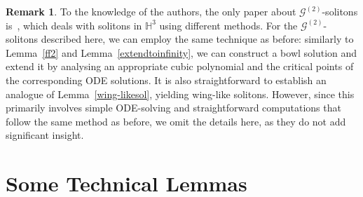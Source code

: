 \documentclass[oneside,12pt]{amsart}
\theoremstyle{definition}
\newtheorem{remark}[lemma]{Remark}
\begin{document}
\begin{remark}
To the knowledge of the authors, the only paper about $\mathcal{G}^{(2)}$-solitons is~\cite{LRS}, which deals with solitons in $\mathbb{H}^3$ using different methods. For the $\mathcal{G}^{(2)}$-solitons described here, we can employ the same technique as before: similarly to Lemma~\ref{ff2} and Lemma~\ref{extendtoinfinity}, we can construct a bowl solution and extend it by analysing an appropriate cubic polynomial and the critical points of the corresponding ODE solutions. It is also straightforward to establish an analogue of Lemma~\ref{wing-likesol}, yielding wing-like solitons. However, since this primarily involves simple ODE-solving and straightforward computations that follow the same method as before, we omit the details here, as they do not add significant insight. 
\end{remark}

\FloatBarrier

\appendix

\section{Some Technical Lemmas} 
\end{document}
